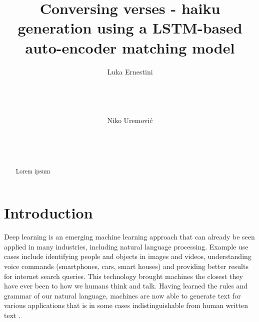 \documentclass{acm_proc_article-sp}
\begin{document}
\title{Conversing verses - haiku generation using a LSTM-based auto-encoder matching model}

\author{
\alignauthor
Luka Ernestini\\
       \\
       \\
       \\

\alignauthor
Niko Uremović\\
       \\
       \\
       \\
}

\maketitle
\begin{abstract}

Lorem ipsum

\end{abstract}




\section{Introduction}

Deep learning is an emerging machine learning approach that can already be seen applied in many industries, including natural language processing. Example use cases include identifying people and objects in images and videos, understanding voice commands (smartphones, cars, smart houses) and providing better results for internet search queries. This technology brought machines the closest they have ever been to how we humans think and talk. Having learned the rules and grammar of our natural language, machines are now able to generate text for various applications that is in some cases indistinguishable from human written text \cite{pawade2018story}.
\end{document}
